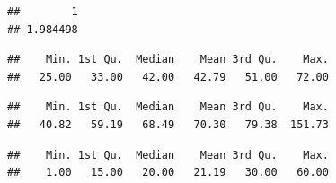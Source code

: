 \documentclass[
  10pt,
]{book}
\newenvironment{Shaded}{\begin{snugshade}}{\end{snugshade}}
\newcommand{\CommentTok}[1]{\textcolor[rgb]{0.56,0.35,0.01}{\textit{#1}}}
\newcommand{\DecValTok}[1]{\textcolor[rgb]{0.00,0.00,0.81}{#1}}
\newcommand{\FunctionTok}[1]{\textcolor[rgb]{0.00,0.00,0.00}{#1}}
\newcommand{\NormalTok}[1]{#1}
\newcommand{\SpecialCharTok}[1]{\textcolor[rgb]{0.00,0.00,0.00}{#1}}
\begin{document}
\begin{verbatim}
##        1 
## 1.984498
\end{verbatim}

\begin{Shaded}
\end{Shaded}

\begin{verbatim}
##    Min. 1st Qu.  Median    Mean 3rd Qu.    Max. 
##   25.00   33.00   42.00   42.79   51.00   72.00
\end{verbatim}

\begin{Shaded}
\end{Shaded}

\begin{verbatim}
##    Min. 1st Qu.  Median    Mean 3rd Qu.    Max. 
##   40.82   59.19   68.49   70.30   79.38  151.73
\end{verbatim}

\begin{Shaded}
\end{Shaded}

\begin{verbatim}
##    Min. 1st Qu.  Median    Mean 3rd Qu.    Max. 
##    1.00   15.00   20.00   21.19   30.00   60.00
\end{verbatim}

\begin{Shaded}
\end{Shaded}
\end{document}
